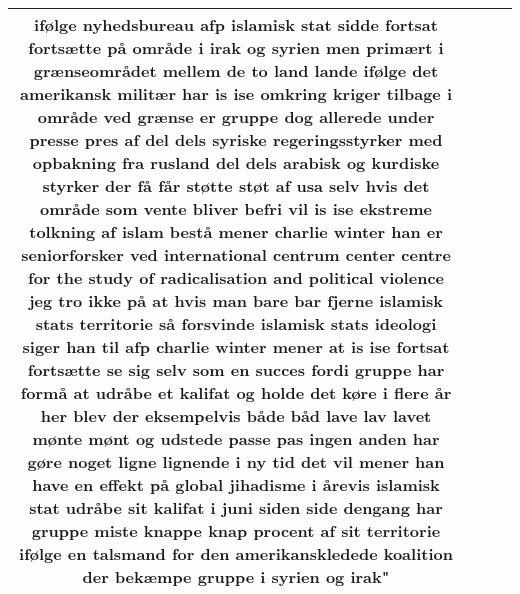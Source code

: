 \begin{xltabular}{\linewidth}{@{}c|c|c|X@{}}
ifølge nyhedsbureau afp islamisk stat sidde fortsat fortsætte på område i irak og syrien men primært i grænseområdet mellem de to land lande ifølge det amerikansk militær har is ise omkring kriger tilbage i område ved grænse er gruppe dog allerede under presse pres af del dels syriske regeringsstyrker med opbakning fra rusland del dels arabisk og kurdiske styrker der få får støtte støt af usa selv hvis det område som vente bliver befri vil is ise ekstreme tolkning af islam bestå mener charlie winter han er seniorforsker ved international centrum center centre for the study of radicalisation and political violence jeg tro ikke på at hvis man bare bar fjerne islamisk stats territorie så forsvinde islamisk stats ideologi siger han til afp charlie winter mener at is ise fortsat fortsætte se sig selv som en succes fordi gruppe har formå at udråbe et kalifat og holde det køre i flere år her blev der eksempelvis både båd lave lav lavet mønte mønt og udstede passe pas ingen anden har gøre noget ligne lignende i ny tid det vil mener han have en effekt på global jihadisme i årevis islamisk stat udråbe sit kalifat i juni siden side dengang har gruppe miste knappe knap procent af sit territorie ifølge en talsmand for den amerikanskledede koalition der bekæmpe gruppe i syrien og irak" \\
		\midrule

\end{xltabular}

